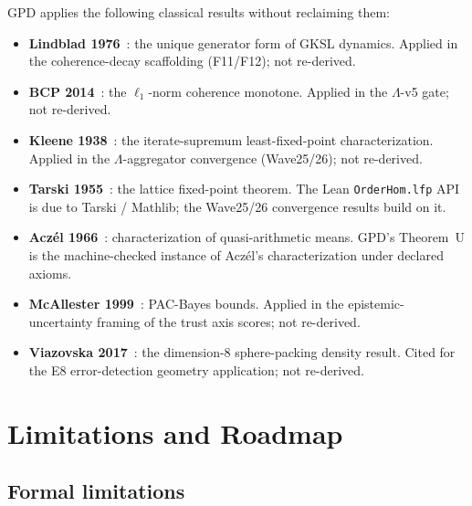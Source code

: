 \documentclass[11pt,letterpaper]{article}
\theoremstyle{definition}
\newcommand{\Lam}{\Lambda}
\begin{document}
GPD applies the following classical results without reclaiming them:
\begin{itemize}[noitemsep]
\item \textbf{Lindblad 1976}~\cite{lindblad1976}: the unique generator form of
  GKSL dynamics.  Applied in the coherence-decay scaffolding (F11/F12); not
  re-derived.
\item \textbf{BCP 2014}~\cite{bcp2014}: the $\ell_1$-norm coherence monotone.
  Applied in the $\Lam$-v5 gate; not re-derived.
\item \textbf{Kleene 1938}~\cite{kleene1938}: the iterate-supremum least-fixed-point
  characterization.  Applied in the $\Lam$-aggregator convergence (Wave25/26); not
  re-derived.
\item \textbf{Tarski 1955}~\cite{tarski1955}: the lattice fixed-point theorem.
  The Lean \texttt{OrderHom.lfp} API is due to Tarski / Mathlib; the Wave25/26
  convergence results build on it.
\item \textbf{Acz\'el 1966}~\cite{aczel1966}: characterization of
  quasi-arithmetic means.  GPD's Theorem~U is the machine-checked instance of
  Acz\'el's characterization under declared axioms.
\item \textbf{McAllester 1999}~\cite{mcallester1999}: PAC-Bayes bounds.  Applied
  in the epistemic-uncertainty framing of the trust axis scores; not re-derived.
\item \textbf{Viazovska 2017}~\cite{viazovska2016}: the dimension-8 sphere-packing
  density result.  Cited for the E8 error-detection geometry application; not
  re-derived.
\end{itemize}

\section{Limitations and Roadmap}
\label{sec:limits}

\subsection{Formal limitations}
\end{document}
